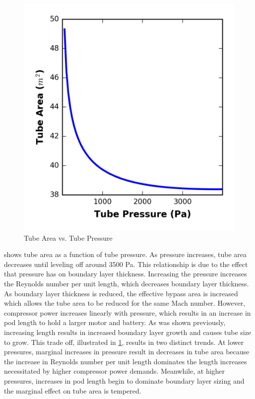\begin{figure}
	\centering
	\includegraphics[width=.45\textwidth]{../../images/graphs/pressure_trades/pressure_vs_Area.png}
	\caption{Tube Area vs. Tube Pressure}
	\label{fig:tube_area_vs_tube_press}
\end{figure}
 shows tube area as a function of tube pressure.
As pressure increases, tube area decreases until leveling off around 3500 Pa.
This relationship is due to the effect that pressure has on boundary layer thickness.
Increasing the pressure increases the Reynolds number per unit length,
which decreases boundary layer thickness. As boundary layer thickness is
reduced, the effective bypass area is increased which allows the tube area to
be reduced for the same Mach number. However, compressor power increases
linearly with pressure, which results in an increase in pod length to hold a
larger motor and battery. As was shown previously, increasing length results in
increased boundary layer growth and causes tube size to grow. This trade off,
illustrated in \cref{fig:tube_area_vs_tube_press}, results in two distinct trends.
At lower pressures, marginal increases in pressure result in decreases in tube
area because the increase in Reynolds number per unit length dominates the
length increases necessitated by higher compressor power demands. Meanwhile,
at higher pressures, increases in pod length begin to dominate boundary layer
sizing and the marginal effect on tube area is tempered.

